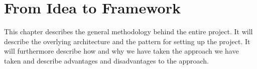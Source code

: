 \chapter{From Idea to Framework}

This chapter describes the general methodology behind the entire project. It will describe the overlying architecture and the pattern for setting up the project. It will furthermore describe how and why we have taken the approach we have taken and describe advantages and disadvantages to the approach. 



